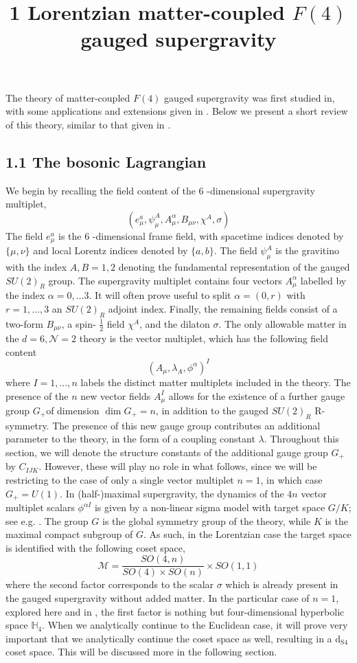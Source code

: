 \documentclass{article}
\begin{document}
\title{
1 Lorentzian matter-coupled \(F(4)\) gauged supergravity
}
The theory of matter-coupled \(F(4)\) gauged supergravity was first studied in, with some applications and extensions given in . Below we present a short review of this theory, similar to that given in .
\subsection*{1.1 The bosonic Lagrangian}
We begin by recalling the field content of the 6 -dimensional supergravity multiplet,
\[
\left(e_{\mu}^{a}, \psi_{\mu}^{A}, A_{\mu}^{\alpha}, B_{\mu \nu}, \chi^{A}, \sigma\right)
\]
The field \(e_{\mu}^{a}\) is the 6 -dimensional frame field, with spacetime indices denoted by \(\{\mu, \nu\}\) and local Lorentz indices denoted by \(\{a, b\}\). The field \(\psi_{\mu}^{A}\) is the gravitino with the index \(A, B=1,2\) denoting the fundamental representation of the gauged \(S U(2)_{R}\) group. The supergravity multiplet contains four vectors \(A_{\mu}^{\alpha}\) labelled by the index \(\alpha=0, \ldots 3\). It will often prove useful to split \(\alpha=(0, r)\) with \(r=1, \ldots, 3\) an \(S U(2)_{R}\) adjoint index. Finally, the remaining fields consist of a two-form \(B_{\mu \nu}\), a spin- \(\frac{1}{2}\) field \(\chi^{A}\), and the dilaton \(\sigma\). The only allowable matter in the \(d=6, \mathcal{N}=2\) theory is the vector multiplet, which has the following field content
\[
\left(A_{\mu}, \lambda_{A}, \phi^{\alpha}\right)^{I}
\]
where \(I=1, \ldots, n\) labels the distinct matter multiplets included in the theory. The presence of the \(n\) new vector fields \(A_{\mu}^{I}\) allows for the existence of a further gauge group \(G_{+}\)of dimension \(\operatorname{dim} G_{+}=n\), in addition to the gauged \(S U(2)_{R}\) R-symmetry. The presence of this new gauge group contributes an additional parameter to the theory, in the form of a coupling constant \(\lambda\). Throughout this section, we will denote the structure constants of the additional gauge group \(G_{+}\)by \(C_{I J K}\). However, these will play no role in what follows, since we will be restricting to the case of only a single vector multiplet \(n=1\), in which case \(G_{+}=U(1)\). In (half-)maximal supergravity, the dynamics of the \(4 n\) vector multiplet scalars \(\phi^{\alpha I}\) is given by a non-linear sigma model with target space \(G / K\); see e.g. . The group \(G\) is the global symmetry group of the theory, while \(K\) is the maximal compact subgroup of \(G\). As such, in the Lorentzian case the target space is identified with the following coset space,
\[
\mathcal{M}=\frac{S O(4, n)}{S O(4) \times S O(n)} \times S O(1,1)
\]
where the second factor corresponds to the scalar \(\sigma\) which is already present in the gauged supergravity without added matter. In the particular case of \(n=1\), explored here and in , the first factor is nothing but four-dimensional hyperbolic space \(\mathbb{H}_{4}\). When we analytically continue to the Euclidean case, it will prove very important that we analytically continue the coset space as well, resulting in a \(\mathrm{d}_{\mathrm{S} 4}\) coset space. This will be discussed more in the following section.
\end{document}
